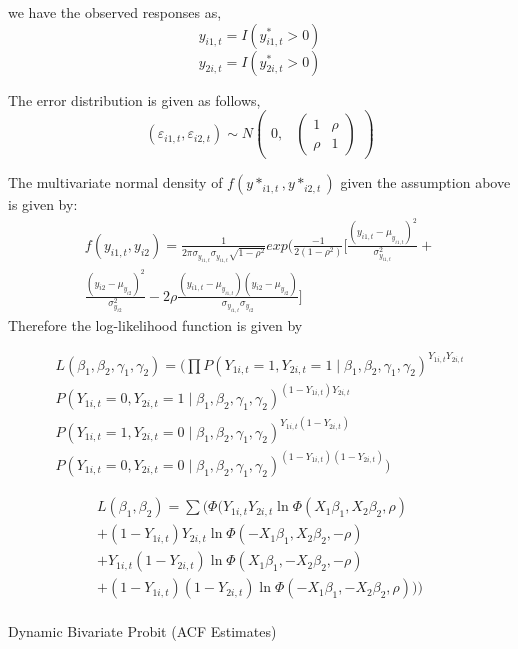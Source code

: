 \documentclass[12pt]{article}
\begin{document}
we have the observed responses as, 
$$y_{i1,t}= I(y^{*}_{i1,t}>0)$$
$$y_{2i,t}= I(y^{*}_{2i,t}>0)$$

The error distribution is given as follows,
$$(\varepsilon_{i1,t}, \varepsilon_{i2,t}) \sim N \begin{pmatrix} 0, & \begin{pmatrix}1 & \rho\\ \rho & 1\end{pmatrix} 
\end{pmatrix}$$

The multivariate normal density  of $f(y*_{i1,t} , y*_{i2,t})$  given the assumption above is given by: 
\begin{equation}
\begin{aligned}
    f(y_{i1,t},y_{i2}) = \frac{1}{2\pi \sigma_{y_{i1,t}}\sigma_{y_{i1,t}}\sqrt{1-\rho^2}} exp(\frac{-1}{2(1-\rho^2)} [\frac{(y_{i1,t} - \mu_{y_{i1,t}})^2}{\sigma_{y_{i1,t}}^{2}} + \\
    \frac{(y_{i2} - \mu_{y_{i2}})^2}{\sigma_{y_{i2}}^{2}} 
    -2 \rho \frac{(y_{i1,t} - \mu_{y_{i1,t}}) (y_{i2} - \mu_{y_{i2}})
    }{\sigma_{y_{i1,t}}\sigma_{y_{i2}}}]
  \end{aligned}
\end{equation}
Therefore the log-likelihood function is given by 

\begin{equation}
\begin{aligned}
L(\beta_1,\beta_2,\gamma_1,\gamma_2) = \Big( \prod
P(Y_{1i,t}=1,Y_{2i,t}=1\mid\beta_1,\beta_2,\gamma_1,\gamma_2)^{Y_{1i,t}Y_{2i,t}}\\
 P(Y_{1i,t}=0,Y_{2i,t}=1\mid\beta_1,\beta_2,\gamma_1,\gamma_2)^{(1-Y_{1i,t})Y_{2i,t}}  \\
P(Y_{1i,t}=1,Y_{2i,t}=0\mid\beta_1,\beta_2,\gamma_1,\gamma_2)^{Y_{1i,t}(1-Y_{2i,t})}\\
P(Y_{1i,t}=0,Y_{2i,t}=0\mid\beta_1,\beta_2,\gamma_1,\gamma_2)^{(1-Y_{1i,t})(1-Y_{2i,t})} \Big)
\end{aligned}
\end{equation}




\begin{equation}
\begin{aligned}
L(\beta_1,\beta_2) = \sum(\Phi( Y_{1i,t}Y_{2i,t}\ln \Phi(X_1\beta_1,X_2\beta_2,\rho) \\
 + (1-Y_{1i,t})Y_{2i,t}\ln \Phi(-X_1\beta_1,X_2\beta_2,-\rho) \\
+ Y_{1i,t}(1-Y_{2i,t})\ln \Phi(X_1\beta_1,-X_2\beta_2,-\rho) \\
 +(1-Y_{1i,t})(1-Y_{2i,t})\ln \Phi(-X_1\beta_1,-X_2\beta_2,\rho) \Big))\\
\end{aligned}
\end{equation}
\begin{center}
\begin{table}[H]
\caption{Dynamic Bivariate Probit (ACF Estimates)}
\label{tab:biprobitacf}

\end{table}
\end{center} 
\end{document}
